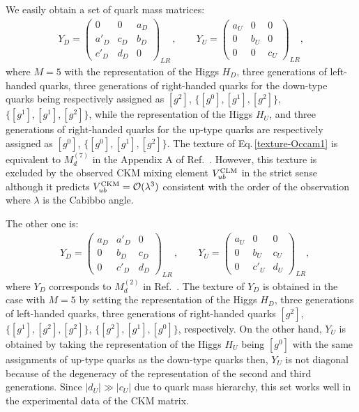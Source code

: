 \documentclass[a4paper,11pt]{article}
\numberwithin{equation}{section}
\begin{document}
We easily obtain a set of quark mass matrices: 
\begin{align}
Y_D=
\begin{pmatrix}
0 & 0 & a_D  \\
a'_D & c_D & b_D \\
c'_D & d_D & 0
\end{pmatrix}_{LR}\,,\qquad 
Y_U =
\begin{pmatrix}
a_U &0 &0  \\
0 & b_U  & 0\\
0& 0& c_U
\end{pmatrix}_{LR},
\label{texture-Occam1}
\end{align}
where $M=5$ with  the representation of the Higgs $H_D$, three generations of left-handed quarks, three generations of right-handed quarks for the down-type quarks being respectively assigned as
$[g^2]$, $\{[g^0], [g^1], [g^2]\}$, $\{[g^1], [g^1], [g^2]\}$, while the representation of the Higgs $H_U$,  and three generations of right-handed quarks for the up-type quarks are respectively assigned as
$[g^0]$, $\{[g^0], [g^1], [g^2]\}$. 
The texture of Eq.\,\eqref{texture-Occam1}
is equivalent to $M_d^{(7)}$ in the Appendix A of  Ref.~\cite{Tanimoto:2016rqy}.
However, this texture is excluded by the observed CKM mixing 
element $V^{\rm CLM}_{ub}$ in the strict sense
although it predicts  $V^{\rm CKM}_{ub}={\cal O}(\lambda^3)$
consistent with the order of the observation
where $\lambda$ is the Cabibbo angle.

The other one is:
\begin{align}
&  Y_D=
\begin{pmatrix}
 a_D &  a'_D &0\\
0 & b_D  & c_D \\
0& c'_D& d_D
\end{pmatrix}_{LR}\,,
\qquad
Y_U =
\begin{pmatrix}
a_U &0 &0  \\
0 & b_U  & c_U\\
0& c'_U& d_U
\end{pmatrix}_{LR},
\label{}
\end{align}
where $Y_D$ corresponds to $M_d^{(2)}$
 in  Ref.~\cite{Tanimoto:2016rqy}. 
 The texture of $Y_D$ is obtained in
 the case with $M=5$ by setting the representation of the Higgs
 $H_D$, three generations of left-handed quarks, three generations of right-handed quarks $[g^2]$, $\{[g^1], [g^2], [g^2]\}$, $\{[g^2], [g^1], [g^0]\}$, respectively. 
  On the other hand, $Y_U$ is obtained
  by taking the representation of the Higgs
 $H_U$ being $[g^0]$ with the same assignments of up-type quarks as the down-type quarks then,
  $Y_U$ is  not diagonal because of
  the degeneracy of the representation of the second and third generations.
  Since $|d_U|\gg |c_U|$ due to quark mass hierarchy, this set works well 
  in the experimental data of the CKM matrix.
\end{document}
